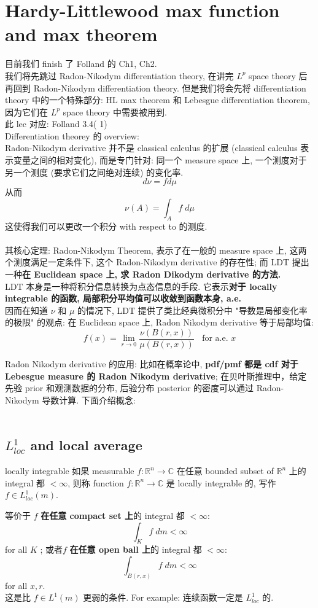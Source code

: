 \documentclass[lang=cn,11pt]{elegantbook}
\begin{document}
\chapter{Hardy-Littlewood max function and max theorem}
目前我们 finish 了 Folland 的 Ch1, Ch2.\\
我们将先跳过 Radon-Nikodym differentiation theory, 在讲完 $L^p$ space theory 后再回到 Radon-Nikodym differentiation theory. 但是我们将会先将 differentiation theory 中的一个特殊部分: HL max theorem 和 Lebesgue differentiation theorem, 因为它们在 $L^p$ space theory 中需要被用到.\\
此 lec 对应: Folland 3.4( 1)\\

Differentiation theorey 的 overview: \\
Radon-Nikodym derivative 并不是 classical calculus 的扩展 (classical calculus 表示变量之间的相对变化), 而是专门针对: 同一个 measure space 上, 一个测度对于另一个测度 (要求它们之间绝对连续) 的变化率. \[
d\nu =  f  d\mu
\]
从而 \[
\nu(A)  = \int_A f \; d\mu
\]
这使得我们可以更改一个积分 with respect to 的测度. \\\\
其核心定理: Radon-Nikodym Theorem, 表示了在一般的 measure space 上, 这两个测度满足一定条件下, 这个 Radon-Nikodym derivative 的存在性; 而 LDT 提出一种\textbf{在 Euclidean space 上, 求 Radon Dikodym derivative 的方法.}\\
LDT 本身是一种将积分信息转换为点态信息的手段. 它表示\textbf{对于 locally integrable 的函数, 局部积分平均值可以收敛到函数本身, a.e.}\\ 
因而在知道 $\nu$ 和 $\mu$ 的情况下, LDT 提供了类比经典微积分中 "导数是局部变化率的极限" 的观点: 在 Euclidean space 上, Radon Nikodym derivative 等于局部均值: \[
f(x)  = \lim_{r \to 0 } \frac{\nu(B(r,x))}{\mu(B(r,x))} \;\; \text{ for a.e. } x
\]

Radon Nikodym derivative 的应用: 比如在概率论中, \textbf{pdf/pmf 都是 cdf 对于 Lebesgue measure 的 Radon Nikodym derivative}; 在贝叶斯推理中，给定先验 prior 和观测数据的分布, 后验分布 posterior 的密度可以通过 Radon-Nikodym 导数计算.
下面介绍概念:\\\\

\section{$L^1_{loc}$ and local average}
\begin{definition}{locally integrable}
如果 measurable  $f:\mathbb{R}^n \to \mathbb{C}$ 在任意 bounded subset of $\mathbb{R}^n$ 上的 integral 都 $< \infty$, 则称 function $f:\mathbb{R}^n \to \mathbb{C}$ 是 locally integrable 的, 写作 $f\in L^1_{loc}(m)$.
\end{definition}
\begin{remark}
    等价于 $f$ \textbf{在任意 compact set 上}的 integral 都 $< \infty$: \[
    \int_K f\; dm < \infty
    \]for all $K$ ; 或者$f$ \textbf{在任意 open ball 上}的 integral 都 $< \infty$: \[
    \int_{B(r,x)} f \; dm< \infty
    \] for all $x,r$.\\
    这是比 $f \in L^1(m)$ 更弱的条件. For example: 连续函数一定是 $L^1_{loc}$ 的.
\end{remark}
\end{document}
